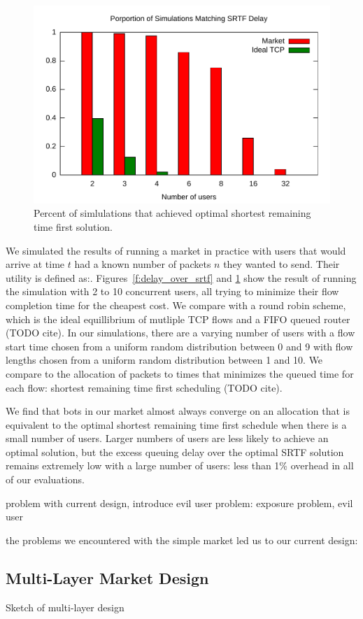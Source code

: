 \begin{figure}
\includegraphics[width=\columnwidth]{plots/percent_match_srtf.pdf}
\caption{Percent of simlulations that achieved optimal shortest remaining time first solution.}
\label{f:percent_match_srtf}
\end{figure}

We simulated the results of running a market in practice with users that would arrive at time $t$ had a known number of packets $n$ they wanted to send.
Their utility is defined as:.
Figures~\ref{f:delay_over_srtf} and \ref{f:percent_match_srtf} show the result of running the simulation with 2 to 10 concurrent users, all trying to minimize their flow completion time for the cheapest cost.
We compare with a round robin scheme, which is the ideal equillibrium of mutliple TCP flows and a FIFO queued router (TODO cite).
In our simulations, there are a varying number of users with a flow start time chosen from a uniform random distribution between 0 and 9 with flow lengths chosen from a uniform random distribution between 1 and 10. We compare to the allocation of packets to times that minimizes the queued time for each flow: shortest remaining time first scheduling (TODO cite).

We find that bots in our market almost always converge on an allocation that is equivalent to the optimal shortest remaining time first schedule when there is a small number of users. Larger numbers of users are less likely to achieve an optimal solution, but the excess queuing delay over the optimal SRTF solution remains extremely low with a large number of users: less than 1\% overhead in all of our evaluations.

problem with current design, introduce evil user
problem: exposure problem, evil user

the problems we encountered with the simple market led us to our current design:
\subsection{Multi-Layer Market Design}

Sketch of multi-layer design
